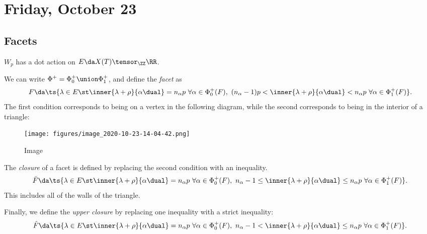 \hypertarget{friday-october-23}{%
\section{Friday, October 23}\label{friday-october-23}}

\hypertarget{facets}{%
\subsection{Facets}\label{facets}}

\(W_p\) has a dot action on \(E \da X(T) \tensor_\ZZ \RR\).

\begin{definition}[Facet]

We can write \(\Phi^+ = \Phi_0^+ \union \Phi_1^+\), and define the
\emph{facet} as
\begin{align*}  
F \da \ts{
\lambda \in E \st \inner{\lambda + \rho}{\alpha\dual} = n_\alpha p\,\, \forall\alpha\in \Phi_0^+(F),\,\,
(n_\alpha - 1)p < \inner{\lambda + \rho}{\alpha\dual} < n_\alpha p \,\,\forall \alpha\in \Phi_1^+(F)
}
.\end{align*} The first condition corresponds to being on a vertex in
the following diagram, while the second corresponds to being in the
interior of a triangle:

\begin{figure}
\centering
\texttt{[image: figures/image\_2020-10-23-14-04-42.png]}
\caption{Image}
\end{figure}

\end{definition}

\begin{definition}

The \emph{closure} of a facet is defined by replacing the second
condition with an inequality.
\begin{align*}  
\bar F \da \ts{
\lambda \in E \st \inner{\lambda + \rho}{\alpha\dual} = n_\alpha p\,\, 
\forall\alpha\in \Phi_0^+(F),\,\,
n_\alpha - 1 \leq  \inner{\lambda + \rho}{\alpha\dual} \leq n_\alpha p 
\,\,\forall \alpha\in \Phi_1^+(F)
}
.\end{align*} This includes all of the walls of the triangle.

\end{definition}

\begin{definition}

Finally, we define the \emph{upper closure} by replacing one inequality
with a strict inequality:
\begin{align*}  
\hat F \da \ts{
\lambda \in E \st \inner{\lambda + \rho}{\alpha\dual} = n_\alpha p\,\, \forall\alpha\in \Phi_0^+(F),\,\,
n_\alpha - 1 < \inner{\lambda + \rho}{\alpha\dual} \leq n_\alpha p \,\,\forall \alpha\in \Phi_1^+(F)
}
.\end{align*}

\end{definition}

